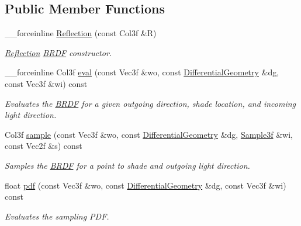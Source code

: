 \subsection*{Public Member Functions}
\begin{DoxyCompactItemize}
\item 
\_\-\_\-forceinline \hyperlink{classembree_1_1_reflection_a80622c4f49e04da0c994dc27c3495d02}{Reflection} (const Col3f \&R)
\begin{DoxyCompactList}\small\item\em \hyperlink{classembree_1_1_reflection}{Reflection} \hyperlink{classembree_1_1_b_r_d_f}{BRDF} constructor. \item\end{DoxyCompactList}\item 
\_\-\_\-forceinline Col3f \hyperlink{classembree_1_1_reflection_a6c444d0ee7455fed9a56a54aefc08d50}{eval} (const Vec3f \&wo, const \hyperlink{structembree_1_1_differential_geometry}{DifferentialGeometry} \&dg, const Vec3f \&wi) const 
\begin{DoxyCompactList}\small\item\em Evaluates the \hyperlink{classembree_1_1_b_r_d_f}{BRDF} for a given outgoing direction, shade location, and incoming light direction. \item\end{DoxyCompactList}\item 
Col3f \hyperlink{classembree_1_1_reflection_ac8763a319aba0109e6283b17b64d719c}{sample} (const Vec3f \&wo, const \hyperlink{structembree_1_1_differential_geometry}{DifferentialGeometry} \&dg, \hyperlink{structembree_1_1_sample}{Sample3f} \&wi, const Vec2f \&s) const 
\begin{DoxyCompactList}\small\item\em Samples the \hyperlink{classembree_1_1_b_r_d_f}{BRDF} for a point to shade and outgoing light direction. \item\end{DoxyCompactList}\item 
float \hyperlink{classembree_1_1_reflection_a8b574ee9c903dd83c5cfcb9fe9e80746}{pdf} (const Vec3f \&wo, const \hyperlink{structembree_1_1_differential_geometry}{DifferentialGeometry} \&dg, const Vec3f \&wi) const 
\begin{DoxyCompactList}\small\item\em Evaluates the sampling PDF. \item\end{DoxyCompactList}\end{DoxyCompactItemize}


